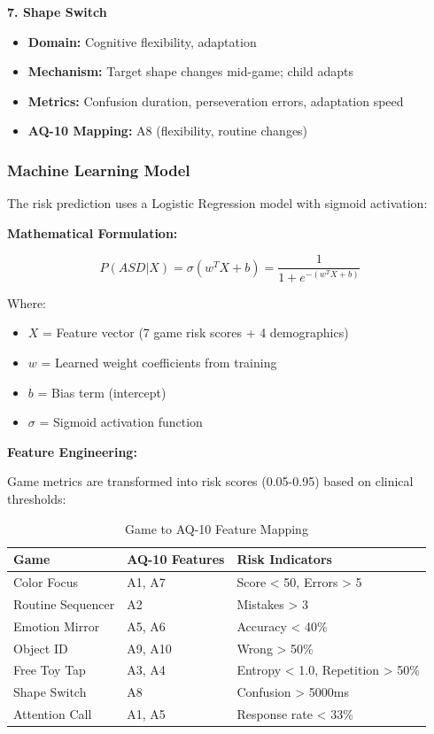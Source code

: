 \documentclass[12pt,letterpaper]{article}
\begin{document}
\textbf{7. Shape Switch}
\begin{itemize}
    \item \textbf{Domain:} Cognitive flexibility, adaptation
    \item \textbf{Mechanism:} Target shape changes mid-game; child adapts
    \item \textbf{Metrics:} Confusion duration, perseveration errors, adaptation speed
    \item \textbf{AQ-10 Mapping:} A8 (flexibility, routine changes)
\end{itemize}

\subsubsection{Machine Learning Model}

The risk prediction uses a Logistic Regression model with sigmoid activation:

\textbf{Mathematical Formulation:}

\begin{equation}
P(ASD|X) = \sigma(w^T X + b) = \frac{1}{1 + e^{-(w^T X + b)}}
\end{equation}

Where:
\begin{itemize}
    \item $X$ = Feature vector (7 game risk scores + 4 demographics)
    \item $w$ = Learned weight coefficients from training
    \item $b$ = Bias term (intercept)
    \item $\sigma$ = Sigmoid activation function
\end{itemize}

\textbf{Feature Engineering:}

Game metrics are transformed into risk scores (0.05-0.95) based on clinical thresholds:

\begin{table}[H]
\centering
\small
\begin{tabular}{|l|l|l|}
\hline
\textbf{Game} & \textbf{AQ-10 Features} & \textbf{Risk Indicators} \\
\hline
Color Focus & A1, A7 & Score < 50, Errors > 5 \\
\hline
Routine Sequencer & A2 & Mistakes > 3 \\
\hline
Emotion Mirror & A5, A6 & Accuracy < 40\% \\
\hline
Object ID & A9, A10 & Wrong > 50\% \\
\hline
Free Toy Tap & A3, A4 & Entropy < 1.0, Repetition > 50\% \\
\hline
Shape Switch & A8 & Confusion > 5000ms \\
\hline
Attention Call & A1, A5 & Response rate < 33\% \\
\hline
\end{tabular}
\caption{Game to AQ-10 Feature Mapping}
\end{table}
\end{document}

